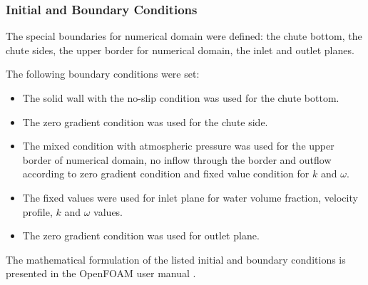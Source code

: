 \documentclass[mathematics,article,submit,pdftex,moreauthors]{Definitions/mdpi}
\begin{document}
\subsubsection{Initial and Boundary Conditions}

The special boundaries for numerical domain were defined: the chute bottom, the chute sides, the upper border for numerical domain, the inlet and outlet planes.

The following boundary conditions were set:

\begin{itemize}
    \item The solid wall with the no-slip condition was used for the chute bottom.
    \item The zero gradient condition was used for the chute side.
    \item The mixed condition with atmospheric pressure was used for the upper border of numerical domain, no inflow through the border and outflow according to zero gradient condition and fixed value condition for $k$ and $\omega$.
    \item The fixed values were used for inlet plane for water volume fraction, velocity profile, $k$ and $\omega$ values.
    \item The zero gradient condition was used for outlet plane.
\end{itemize}

The mathematical formulation of the listed initial and boundary conditions is presented in the OpenFOAM user manual \cite{OFUG}.
\end{document}

